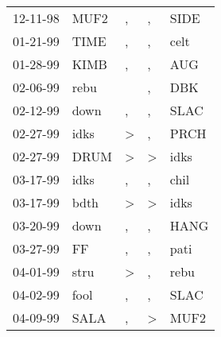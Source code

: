\begin{supertabular}{p{0.07\textwidth}p{0.06\textwidth}p{0.02\textwidth}p{0.02\textwidth}p{0.06\textwidth}}
          12-11-98\textsuperscript{} &           MUF2\textsuperscript{} &                , &                , &           SIDE\textsuperscript{} \\
          01-21-99\textsuperscript{} &           TIME\textsuperscript{} &                , &                , &           celt\textsuperscript{} \\
          01-28-99\textsuperscript{} &           KIMB\textsuperscript{} &                , &                , &            AUG\textsuperscript{} \\
          02-06-99\textsuperscript{} &           rebu\textsuperscript{} &                  &                , &            DBK\textsuperscript{} \\
          02-12-99\textsuperscript{} &           down\textsuperscript{} &                , &                , &           SLAC\textsuperscript{} \\
          02-27-99\textsuperscript{} &           idks\textsuperscript{} &     \textgreater &                , &           PRCH\textsuperscript{} \\
          02-27-99\textsuperscript{} &           DRUM\textsuperscript{} &     \textgreater &     \textgreater &           idks\textsuperscript{} \\
          03-17-99\textsuperscript{} &           idks\textsuperscript{} &                , &                , &           chil\textsuperscript{} \\
          03-17-99\textsuperscript{} &           bdth\textsuperscript{} &     \textgreater &     \textgreater &           idks\textsuperscript{} \\
          03-20-99\textsuperscript{} &           down\textsuperscript{} &                , &                , &           HANG\textsuperscript{} \\
          03-27-99\textsuperscript{} &             FF\textsuperscript{} &                , &                , &           pati\textsuperscript{} \\
          04-01-99\textsuperscript{} &           stru\textsuperscript{} &     \textgreater &                , &           rebu\textsuperscript{} \\
          04-02-99\textsuperscript{} &           fool\textsuperscript{} &                , &                , &           SLAC\textsuperscript{} \\
          04-09-99\textsuperscript{} &           SALA\textsuperscript{} &                , &     \textgreater &           MUF2\textsuperscript{} \\

\end{supertabular}
